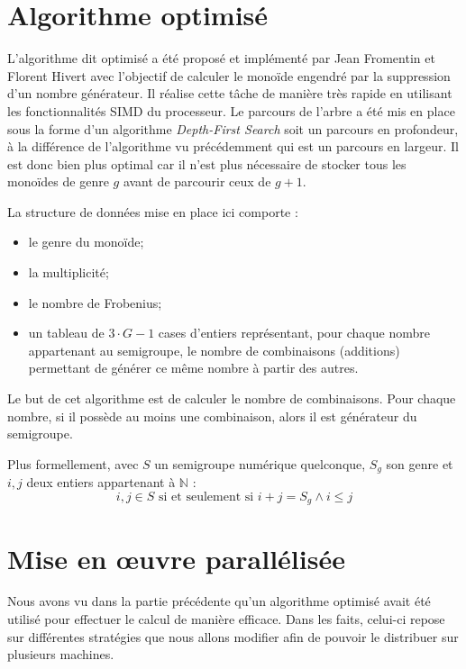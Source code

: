 \documentclass[12pt,a4paper]{report}
\let\leq\leqslant
\begin{document}
\section{Algorithme optimisé}
L'algorithme dit optimisé a été proposé et implémenté par Jean Fromentin et Florent Hivert \cite{exploring-ns} avec l'objectif de calculer le monoïde engendré par la suppression d'un nombre générateur. Il réalise cette tâche de manière très rapide en utilisant les fonctionnalités SIMD du processeur. Le parcours de l'arbre a été mis en place sous la forme d'un algorithme \emph{Depth-First Search} soit un parcours en profondeur, à la différence de l'algorithme vu précédemment qui est un parcours en largeur. Il est donc bien plus optimal car il n'est plus nécessaire de stocker tous les monoïdes de genre $g$ avant de parcourir ceux de $g + 1$.

La structure de données mise en place ici comporte :
\begin{itemize}
	\item	le genre du monoïde;
	\item	la multiplicité;
	\item	le nombre de Frobenius;
	\item	un tableau de $3 \cdot G - 1$ cases d'entiers représentant, pour chaque nombre appartenant au semigroupe, le nombre de combinaisons (additions) permettant de générer ce même nombre à partir des autres.
\end{itemize}

Le but de cet algorithme est de calculer le nombre de combinaisons. Pour chaque nombre, si il possède au moins une combinaison, alors il est générateur du semigroupe.

Plus formellement, avec $S$ un semigroupe numérique quelconque, $S_g$ son genre et $i, j$ deux entiers appartenant à $\mathbb{N}$ :
\[ i, j \in S \text{ si et seulement si } i + j = S_g \land i \leq j \]

\section{Mise en \oe{}uvre parallélisée}
Nous avons vu dans la partie précédente qu'un algorithme optimisé avait été utilisé pour effectuer le calcul de manière efficace. Dans les faits, celui-ci repose sur différentes stratégies que nous allons modifier afin de pouvoir le distribuer sur plusieurs machines.
\end{document}
